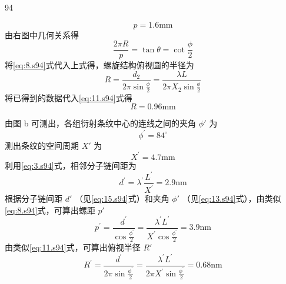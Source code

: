 \begin{solution}{94}
\begin{subsolution}
\begin{equation}
p = 1. 6 \mathrm{mm}
\label{eq:9.s94}
\end{equation}
由右图中几何关系得
\begin{equation}
\frac {2 \pi R}{p} = \tan \theta = \cot \frac {\phi}{2}
\label{eq:10.s94}
\end{equation}
将\eqref{eq:8.s94}式代入上式得，螺旋结构俯视圆的半径为
\begin{equation}
R = \frac {d _ {2}}{2 \pi \sin \frac {\phi}{2}} = \frac {\lambda L}{2 \pi X _ {2} \sin \frac {\phi}{2}}
\label{eq:11.s94}
\end{equation}
将已得到的数据代入\eqref{eq:11.s94}式得
\begin{equation}
R = 0. 9 6 \mathrm{mm}
\label{eq:12.s94}
\end{equation}
\end{subsolution}
\begin{subsolution}
由图 b 可测出，各组衍射条纹中心的连线之间的夹角 $\phi'$ 为
\begin{equation}
\phi^ {\prime} = 8 4 ^ {\circ}
\label{eq:13.s94}
\end{equation}
测出条纹的空间周期 $X'$ 为
\begin{equation}
X ^ {\prime} = 4. 7 \mathrm{mm}
\label{eq:14.s94}
\end{equation}
利用\eqref{eq:3.s94}式，相邻分子链间距为
\begin{equation}
d ^ {\prime} = \lambda^ {\prime} \frac {L ^ {\prime}}{X ^ {\prime}} = 2. 9 \mathrm{nm}
\label{eq:15.s94}
\end{equation}
根据分子链间距 $d'$ （见\eqref{eq:15.s94}式）和夹角 $\phi'$ （见\eqref{eq:13.s94}式），由类似\eqref{eq:8.s94}式，可算出螺距 $p'$
\begin{equation}
p ^ {\prime} = \frac {d ^ {\prime}}{\cos \frac {\phi^ {\prime}}{2}} = \frac {\lambda^ {\prime} L ^ {\prime}}{X ^ {\prime} \cos \frac {\phi^ {\prime}}{2}} = 3. 9 \mathrm{nm}
\label{eq:16.s94}
\end{equation}
由类似\eqref{eq:11.s94}式，可算出俯视半径 $R'$
\begin{equation}
R ^ {\prime} = \frac {d ^ {\prime}}{2 \pi \sin \frac {\phi^ {\prime}}{2}} = \frac {\lambda^ {\prime} L ^ {\prime}}{2 \pi X ^ {\prime} \sin \frac {\phi^ {\prime}}{2}} = 0. 6 8 \mathrm{nm}
\label{eq:17.s94}
\end{equation}
\end{subsolution}
\end{solution}